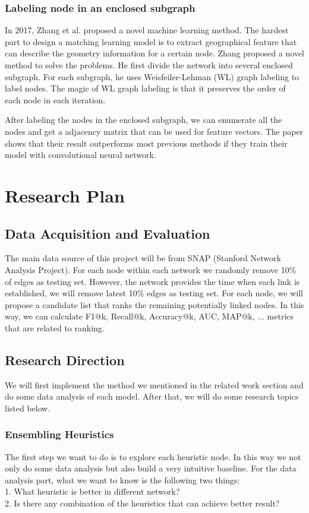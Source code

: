 \documentclass[paper=letter, fontsize=12pt]{scrartcl} %
\begin{document}
	\subsubsection {Labeling node in an enclosed subgraph}
	In 2017, Zhang et al. proposed a novel machine learning method. The hardest part to design a matching learning model is to extract geographical feature that can describe the geometry information for a certain node. Zhang proposed a novel method to solve the problems. He first divide the network into several enclosed subgraph. For each subgraph, he uses Weisfeiler-Lehman (WL) graph labeling to label nodes. The magic of WL graph labeling is that it preserves the order of each node in each iteration.
	
	After labeling the nodes in the enclosed subgraph, we can enumerate all the nodes and get a adjacency matrix that can be used for feature vectors. The paper shows that their result outperforms most previous methods if they train their model with convolutional neural network.
	
	
	\section{Research Plan}
	
	\subsection{Data Acquisition and Evaluation}
	The main data source of this project will be from SNAP (Stanford Network Analysis Project).
	For each node within each network we randomly remove 10\% of edges as testing set. However, the network provides the time when each link is established, we will remove latest 10\% edges as testing set. For each node, we will propose a candidate list that ranks the remaining potentially linked nodes. In this way, we can calculate F1@k, Recall@k, Accuracy@k, AUC, MAP@k, ... metrics that are related to ranking. 
	
	\subsection {Research Direction}
	We will first implement the method we mentioned in the related work section and do some data analysis of each model. After that, we will do some research topics listed below. 
	
	\subsubsection {Ensembling Heuristics}
	The first step we want to do is to explore each heuristic node. In this way we not only do some data analysis but also build a very intuitive baseline. 
	For the data analysis part, what we want to know is the following two things: \\
	1. What heuristic is better in different network? \\
	2. Is there any combination of the heuristics that can achieve better result? \\
	
\end{document}

